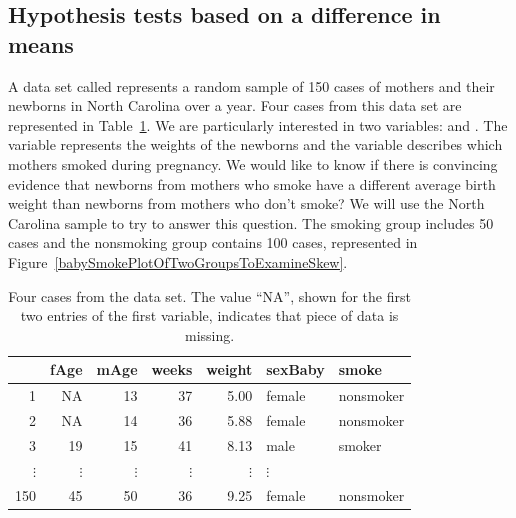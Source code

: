 \subsection{Hypothesis tests based on a difference in means}


A data set called  represents a random sample of 150 cases of mothers and their newborns in North Carolina over a year. Four cases from this data set are represented in Table~\ref{babySmokeDF}. We are particularly interested in two variables:  and . The  variable represents the weights of the newborns and the  variable describes which mothers smoked during pregnancy. We would like to know if there is convincing evidence that newborns from mothers who smoke have a different average birth weight than newborns from mothers who don't smoke? We will use the North Carolina sample to try to answer this question. The smoking group includes 50 cases and the nonsmoking group contains 100 cases, represented in Figure~\ref{babySmokePlotOfTwoGroupsToExamineSkew}.

\begin{table}
\centering
\begin{tabular}{rrrrrll}
  \hline
 & fAge & mAge & weeks & weight & sexBaby & smoke \\ 
  \hline
1 & NA & 13 &  37 & 5.00 & female & nonsmoker \\ 
  2 & NA & 14 &  36 & 5.88 & female & nonsmoker \\ 
  3 & 19 & 15 &  41 & 8.13 & male & smoker \\ 
  $\vdots$ &   $\vdots$ &   $\vdots$ &   $\vdots$ &   $\vdots$ &   $\vdots$ \\
  150 & 45 & 50 &  36 & 9.25 & female & nonsmoker \\ 
   \hline
\end{tabular}
\caption{Four cases from the  data set. The value ``NA'', shown for the first two entries of the first variable, indicates that piece of data is missing.}
\label{babySmokeDF}
\end{table}

